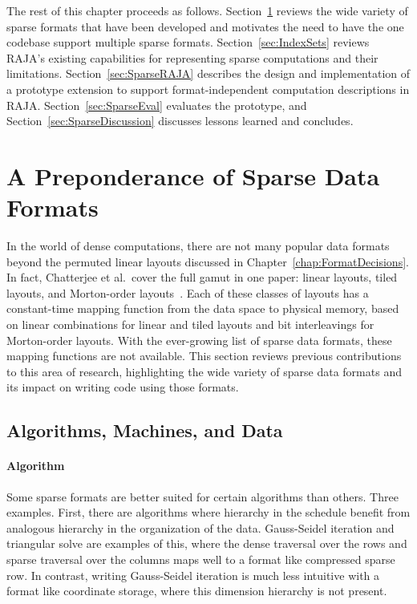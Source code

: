 The rest of this chapter proceeds as follows.
Section~\ref{sec:SparseFormats} reviews the wide variety of sparse formats that have been developed and motivates the need to have the one codebase support multiple sparse formats.
Section~\ref{sec:IndexSets} reviews RAJA's existing capabilities for representing sparse computations and their limitations.
Section~\ref{sec:SparseRAJA} describes the design and implementation of a prototype extension to support format-independent computation descriptions in RAJA\@.
Section~\ref{sec:SparseEval} evaluates the prototype, and Section~\ref{sec:SparseDiscussion} discusses lessons learned and concludes.



\section{A Preponderance of Sparse Data Formats}\label{sec:SparseFormats}



In the world of dense computations, there are not many popular data formats beyond the permuted linear layouts discussed in Chapter~\ref{chap:FormatDecisions}. 
In fact, Chatterjee et al.\ cover the full gamut in one paper: linear layouts, tiled layouts, and Morton-order layouts~\cite{chatterjee1999recursive}.
Each of these classes of layouts has a constant-time mapping function from the data space to physical memory, based on linear combinations for linear and tiled layouts and bit interleavings for Morton-order layouts.
With the ever-growing list of sparse data formats, these mapping functions are not available.
This section reviews previous contributions to this area of research, highlighting the wide variety of sparse data formats and its impact on writing code using those formats.


\subsection{Algorithms, Machines, and Data}

\paragraph{Algorithm}

Some sparse formats are better suited for certain algorithms than others.
Three examples.
First, there are algorithms where hierarchy in the schedule benefit from analogous hierarchy in the organization of the data.
Gauss-Seidel iteration and triangular solve are examples of this, where the dense traversal over the rows and sparse traversal over the columns maps well to a format like compressed sparse row. 
In contrast, writing Gauss-Seidel iteration is much less intuitive with a format like coordinate storage, where this dimension hierarchy is not present.

